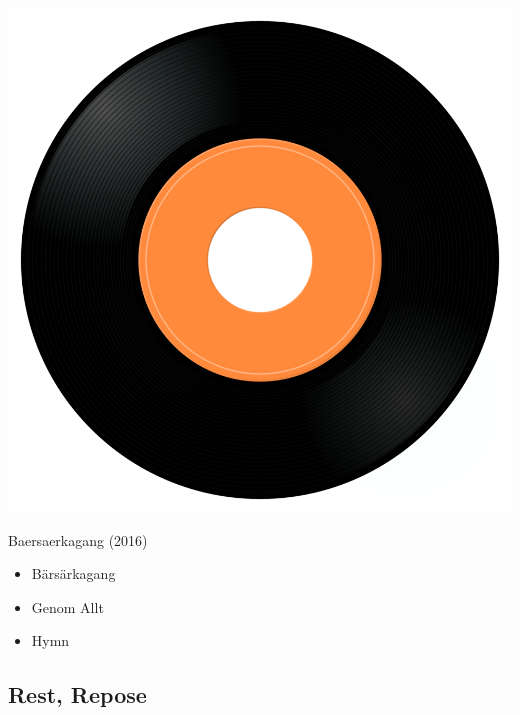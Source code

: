 \begin{minipage}[t]{0.25\textwidth}
\captionsetup{type=figure}
\includegraphics[width=\textwidth]{Images/cover.png}
\caption*{Baersaerkagang (2016)}
\end{minipage}
\begin{minipage}[t]{0.25\textwidth}\vspace{0pt}
\begin{itemize}[nosep,leftmargin=1em,labelwidth=*,align=left]
	\setlength{\itemsep}{0pt}
	\item Bärsärkagang
	\item Genom Allt 
	\item Hymn
\end{itemize}
\end{minipage}

\subsection{Rest, Repose}

